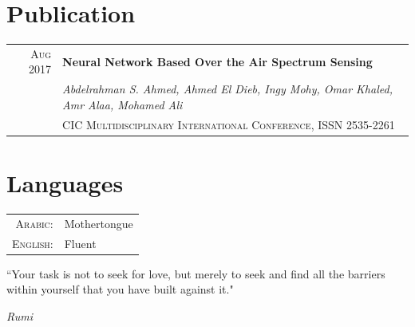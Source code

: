 \documentclass[a4paper,10pt]{article}
\begin{document}
\section{Publication}
\begin{tabular}{rl}

 \textsc{Aug 2017} &\textbf{Neural Network Based Over the Air Spectrum Sensing}\\
 &\small\emph {Abdelrahman S. Ahmed, Ahmed El Dieb, Ingy Mohy, Omar Khaled, Amr Alaa, Mohamed Ali} \\ 
 &\textsc{CIC Multidisciplinary International Conference, ISSN 2535-2261}

\end{tabular}

\section{Languages}
\begin{tabular}{rl}
\textsc{Arabic:}&Mothertongue\\
\textsc{English:}&Fluent\\
\end{tabular}
\vfill




\epigraph{ “Your task is not to seek for love, but merely to seek and find all the barriers within yourself that you have built against it."
 }{\textit{Rumi  \\}}
\end{document}
